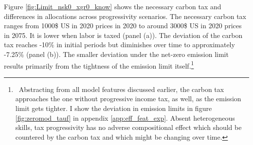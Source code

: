 Figure \ref{fig:Limit_nsk0_xgr0_know} shows the necessary carbon tax and differences in allocations across progressivity scenarios. 
The necessary carbon tax ranges from 1000\$ US in 2020 prices in 2020 to around 3000\$ US in 2020 prices in 2075. It is lower when labor is taxed (panel (a)). The deviation of the carbon tax reaches -10\% in initial periods but diminishes over time to approximately -7.25\% (panel (b)).
The smaller deviation under the net-zero emission limit results primarily from the tightness of the emission limit itself.\footnote{\ Abstracting from all model features discussed earlier, the carbon tax approaches the one without progressive income tax, as well, as the emission limit gets tighter. I show the deviation in emission limits in figure \ref{fig:zeromod_tauf} in appendix \ref{app:eff_feat_exp}. Absent heterogeneous skills, tax progressivity has no adverse compositional effect which should be countered by the carbon tax and which might be changing over time. }





